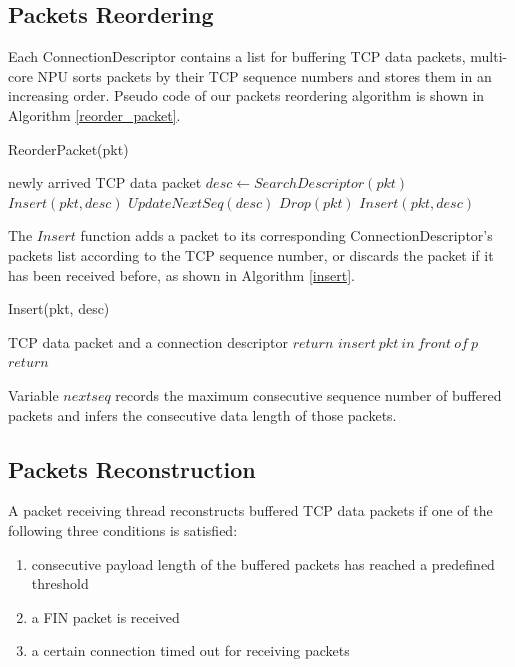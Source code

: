 \documentclass[conference]{IEEEtran}
\begin{document}
\subsection{Packets Reordering}
Each ConnectionDescriptor contains a list for buffering TCP data packets, multi-core NPU sorts packets by their TCP sequence numbers and stores them in an increasing order. Pseudo code of our packets reordering algorithm is shown in Algorithm \ref{reorder_packet}.
\begin{algorithm}
\caption{ReorderPacket(pkt)}
\label{reorder_packet}
\begin{algorithmic}
\REQUIRE newly arrived TCP data packet
\STATE $desc \leftarrow SearchDescriptor(pkt)$
\STATE $Insert(pkt, desc)$
\STATE $UpdateNextSeq(desc)$
\ELSE {}
    \STATE $Drop(pkt)$
    \ELSE \STATE $Insert(pkt, desc)$
    \ENDIF
\ENDIF
\end{algorithmic}
\end{algorithm}
The $Insert$ function adds a packet to its corresponding ConnectionDescriptor's packets list according to the TCP sequence number, or discards the packet if it has been received before, as shown in Algorithm \ref{insert}.
\begin{algorithm}
\caption{Insert(pkt, desc)}
\label{insert}
\begin{algorithmic}
\REQUIRE TCP data packet and a connection descriptor
\STATE $return$
\ELSE {}
    \STATE $insert\ pkt\ in\ front\ of\ p$
    \STATE $return$
    \ENDIF
\ENDIF
\ENDFOR
\end{algorithmic}
\end{algorithm}
Variable $nextseq$ records the maximum consecutive sequence number of buffered packets and infers the consecutive data length of those packets.
\subsection{Packets Reconstruction}
A packet receiving thread reconstructs buffered TCP data packets if one of the following three conditions is satisfied:
\begin{enumerate}
\item consecutive payload length of the buffered packets has reached a predefined threshold
\item a FIN packet is received
\item a certain connection timed out for receiving packets
\end{enumerate}
\end{document}
